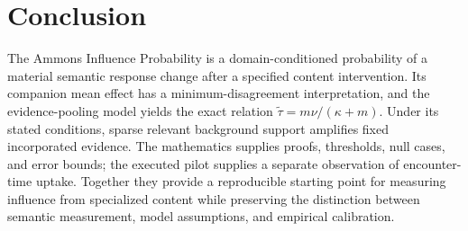 \documentclass[11pt,letterpaper]{article}
\theoremstyle{definition}\newtheorem{definition}[theorem]{Definition}
\begin{document}
\section{Conclusion}
The Ammons Influence Probability is a domain-conditioned probability of a material semantic response change after a specified content intervention. Its companion mean effect has a minimum-disagreement interpretation, and the evidence-pooling model yields the exact relation $\widetilde\tau=m\nu/(\kappa+m)$. Under its stated conditions, sparse relevant background support amplifies fixed incorporated evidence. The mathematics supplies proofs, thresholds, null cases, and error bounds; the executed pilot supplies a separate observation of encounter-time uptake. Together they provide a reproducible starting point for measuring influence from specialized content while preserving the distinction between semantic measurement, model assumptions, and empirical calibration.

\clearpage
\appendix
\end{document}
